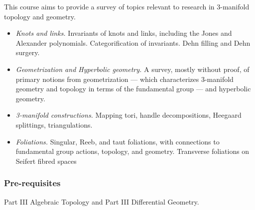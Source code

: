 \documentclass[a4paper]{article}
\begin{document}
\maketitle
{\small
\setlength{\parindent}{0em}
\setlength{\parskip}{1em}
This course aims to provide a survey of topics relevant to research in 3-manifold topology and geometry.
\begin{itemize}
 \item \textit{Knots and links.} Invariants of knots and links, including the Jones and Alexander polynomials. Categorification of invariants. Dehn filling and Dehn surgery.
 \item \textit{Geometrization and Hyperbolic geometry.} A survey, mostly without proof, of primary notions from geometrization --- which characterizes 3-manifold geometry and topology in terms of the fundamental group --- and hyperbolic geometry.
 \item \textit{3-manifold constructions.} Mapping tori, handle decompositions, Heegaard splittings, triangulations.
 \item \textit{Foliations.} Singular, Reeb, and taut foliations, with connections to fundamental group actions, topology, and geometry. Transverse foliations on Seifert fibred spaces
\end{itemize}
\subsubsection*{Pre-requisites}
Part III Algebraic Topology and Part III Differential Geometry.
}
\tableofcontents

\printindex
\end{document}
